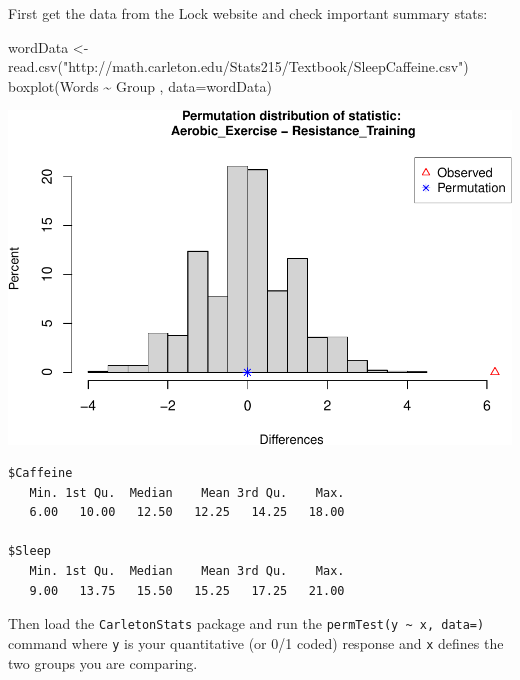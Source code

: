 \documentclass[
]{book}
\newenvironment{Shaded}{\begin{snugshade}}{\end{snugshade}}
\newcommand{\AttributeTok}[1]{\textcolor[rgb]{0.77,0.63,0.00}{#1}}
\newcommand{\FunctionTok}[1]{\textcolor[rgb]{0.00,0.00,0.00}{#1}}
\newcommand{\NormalTok}[1]{#1}
\newcommand{\OtherTok}[1]{\textcolor[rgb]{0.56,0.35,0.01}{#1}}
\newcommand{\SpecialCharTok}[1]{\textcolor[rgb]{0.00,0.00,0.00}{#1}}
\newcommand{\StringTok}[1]{\textcolor[rgb]{0.31,0.60,0.02}{#1}}
\begin{document}
First get the data from the Lock website and check important summary stats:

\begin{Shaded}
\begin{Highlighting}[]
\NormalTok{wordData }\OtherTok{\textless{}{-}} \FunctionTok{read.csv}\NormalTok{(}\StringTok{"http://math.carleton.edu/Stats215/Textbook/SleepCaffeine.csv"}\NormalTok{)}
\FunctionTok{boxplot}\NormalTok{(Words }\SpecialCharTok{\textasciitilde{}}\NormalTok{ Group , }\AttributeTok{data=}\NormalTok{wordData)}
\end{Highlighting}
\end{Shaded}

\includegraphics[width=1\linewidth]{Class_Activity_13_files/figure-latex/unnamed-chunk-1-1}

\begin{Shaded}
\end{Shaded}

\begin{verbatim}
$Caffeine
   Min. 1st Qu.  Median    Mean 3rd Qu.    Max. 
   6.00   10.00   12.50   12.25   14.25   18.00 

$Sleep
   Min. 1st Qu.  Median    Mean 3rd Qu.    Max. 
   9.00   13.75   15.50   15.25   17.25   21.00 
\end{verbatim}

Then load the \texttt{CarletonStats} package and run the \texttt{permTest(y\ \textasciitilde{}\ x,\ data=)} command where \texttt{y} is your quantitative (or 0/1 coded) response and \texttt{x} defines the two groups you are comparing.
\end{document}
